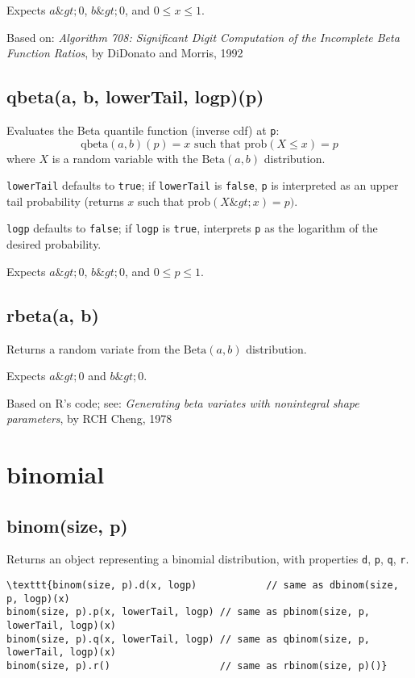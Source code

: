 \documentclass{article}
\begin{document}
Expects $a\&gt;0$, $b\&gt;0$, and $0 \leq x \leq 1$.


Based on: \emph{Algorithm 708: Significant Digit Computation of the Incomplete Beta Function
Ratios}, by DiDonato and Morris, 1992


    \subsection*{qbeta(a, b, lowerTail, logp)(p)}
    Evaluates the Beta quantile function (inverse cdf) at \texttt{p}:
$$\textrm{qbeta}(a, b)(p) = x \textrm{ such that } \textrm{prob}(X \leq x) = p$$
where $X$ is a random variable with the $\textrm{Beta}(a,b)$ distribution.


\texttt{lowerTail} defaults to \texttt{true}; if \texttt{lowerTail} is \texttt{false}, \texttt{p} is
interpreted as an upper tail probability (returns
$x$ such that $\textrm{prob}(X \&gt; x) = p)$.


\texttt{logp} defaults to \texttt{false}; if \texttt{logp} is \texttt{true}, interprets \texttt{p} as
the logarithm of the desired probability.


Expects $a\&gt;0$, $b\&gt;0$, and $0 \leq p \leq 1$.


    \subsection*{rbeta(a, b)}
    Returns a random variate from the $\textrm{Beta}(a, b)$ distribution.


Expects $a\&gt;0$ and $b\&gt;0$.


Based on R's code; see: \emph{Generating beta variates with nonintegral shape parameters}, by
RCH Cheng, 1978


  \section{binomial}
    \subsection*{binom(size, p)}
    Returns an object representing a binomial distribution, with properties \texttt{d}, \texttt{p}, \texttt{q}, \texttt{r}.


\begin{lstlisting}
\texttt{binom(size, p).d(x, logp)            // same as dbinom(size, p, logp)(x)
binom(size, p).p(x, lowerTail, logp) // same as pbinom(size, p, lowerTail, logp)(x)
binom(size, p).q(x, lowerTail, logp) // same as qbinom(size, p, lowerTail, logp)(x)
binom(size, p).r()                   // same as rbinom(size, p)()}\end{lstlisting}
\end{document}
